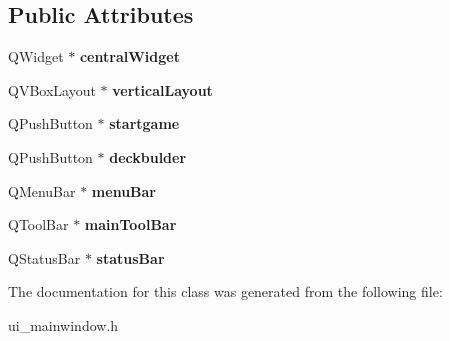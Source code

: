 \subsection*{Public Attributes}
\begin{DoxyCompactItemize}
\item 
\mbox{\label{class_ui___main_window_a30075506c2116c3ed4ff25e07ae75f81}} 
Q\+Widget $\ast$ {\bfseries central\+Widget}
\item 
\mbox{\label{class_ui___main_window_aecd96a04789fcfec3f98d80390ad8184}} 
Q\+V\+Box\+Layout $\ast$ {\bfseries vertical\+Layout}
\item 
\mbox{\label{class_ui___main_window_a8af79249bed79a1ee3722a02893f2cd8}} 
Q\+Push\+Button $\ast$ {\bfseries startgame}
\item 
\mbox{\label{class_ui___main_window_a3dc5133f4755ae6e4c89890f3f9cc2d3}} 
Q\+Push\+Button $\ast$ {\bfseries deckbulder}
\item 
\mbox{\label{class_ui___main_window_a2be1c24ec9adfca18e1dcc951931457f}} 
Q\+Menu\+Bar $\ast$ {\bfseries menu\+Bar}
\item 
\mbox{\label{class_ui___main_window_a5172877001c8c7b4e0f6de50421867d1}} 
Q\+Tool\+Bar $\ast$ {\bfseries main\+Tool\+Bar}
\item 
\mbox{\label{class_ui___main_window_a50fa481337604bcc8bf68de18ab16ecd}} 
Q\+Status\+Bar $\ast$ {\bfseries status\+Bar}
\end{DoxyCompactItemize}


The documentation for this class was generated from the following file\+:\begin{DoxyCompactItemize}
\item 
ui\+\_\+mainwindow.\+h\end{DoxyCompactItemize}
